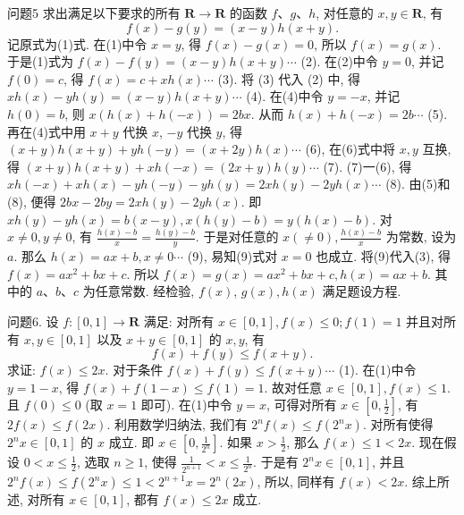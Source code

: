 问题5 求出满足以下要求的所有 $\mathbf{R} \rightarrow \mathbf{R}$ 的函数 $f 、 g 、 h$, 对任意的 $x, y \in \mathbf{R}$, 有
$$
f(x)-g(y)=(x-y) h(x+y) .
$$
记原式为(1)式.
在(1)中令 $x=y$, 得 $f(x)-g(x)=0$, 所以 $f(x)= g(x)$. 于是(1)式为 $f(x)-f(y)=(x-y) h(x+y) \cdots$ (2). 在(2)中令 $y=0$, 并记 $f(0)=c$, 得 $f(x)=c+x h(x) \cdots$ (3). 将 (3) 代入 (2) 中, 得 $x h(x)- y h(y)=(x-y) h(x+y) \cdots$ (4). 在(4)中令 $y=-x$, 并记 $h(0)=b$, 则 $x(h(x)+ h(-x))=2 b x$. 从而 $h(x)+h(-x)=2 b \cdots$ (5). 再在(4)式中用 $x+y$ 代换 $x$, $-y$ 代换 $y$, 得 $(x+y) h(x+y)+y h(-y)=(x+2 y) h(x) \cdots$ (6), 在(6)式中将 $x, y$ 互换, 得 $(x+y) h(x+y)+x h(-x)=(2 x+y) h(y) \cdots$ (7). (7)一(6), 得 $x h(-x)+x h(x)-y h(-y)-y h(y)=2 x h(y)-2 y h(x) \cdots$ (8). 由(5)和(8), 便得 $2 b x-2 b y=2 x h(y)-2 y h(x)$. 即 $x h(y)-y h(x)=b(x-y), x(h(y)-b)=y(h(x)-b)$. 对 $x \neq 0, y \neq 0$, 有 $\frac{h(x)-b}{x}=\frac{h(y)-b}{y}$. 于是对任意的 $x(\neq 0), \frac{h(x)-b}{x}$ 为常数, 设为 $a$. 那么 $h(x)=a x+b, x \neq 0 \cdots$ (9), 易知(9)式对 $x=0$ 也成立.
将(9)代入(3), 得 $f(x)=a x^2+b x+c$. 所以 $f(x)=g(x)= a x^2+b x+c, h(x)=a x+b$. 其中的 $a 、 b 、 c$ 为任意常数.
经检验, $f(x)$, $g(x), h(x)$ 满足题设方程.



问题6. 设 $f:[0,1] \rightarrow \mathbf{R}$ 满足: 对所有 $x \in[0,1], f(x) \leqslant 0 ; f(1)=1$ 并且对所有 $x, y \in[0,1]$ 以及 $x+y \in[0,1]$ 的 $x, y$, 有
$$
f(x)+f(y) \leqslant f(x+y) .
$$
求证: $f(x) \leqslant 2 x$.
对于条件 $f(x)+f(y) \leqslant f(x+y) \cdots$ (1). 在(1)中令 $y=1-x$, 得 $f(x)+f(1-x) \leqslant f(1)=1$. 故对任意 $x \in[0,1], f(x) \leqslant 1$. 且 $f(0) \leqslant 0$ (取 $x=1$ 即可). 在(1)中令 $y=x$, 可得对所有 $x \in\left[0, \frac{1}{2}\right]$, 有 $2 f(x) \leqslant f(2 x)$. 利用数学归纳法, 我们有 $2^n f(x) \leqslant f\left(2^n x\right)$. 对所有使得 $2^n x \in[0,1]$ 的 $x$ 成立.
即 $x \in\left[0, \frac{1}{2^n}\right]$. 如果 $x>\frac{1}{2}$, 那么 $f(x) \leqslant 1<2 x$. 现在假设 $0< x \leqslant \frac{1}{2}$, 选取 $n \geqslant 1$, 使得 $\frac{1}{2^{n+1}}<x \leqslant \frac{1}{2^n}$. 于是有 $2^n x \in[0,1]$, 并且 $2^n f(x) \leqslant f\left(2^n x\right) \leqslant 1<2^{n+1} x=2^n(2 x)$, 所以, 同样有 $f(x)<2 x$. 综上所述, 对所有 $x \in[0,1]$, 都有 $f(x) \leqslant 2 x$ 成立.



